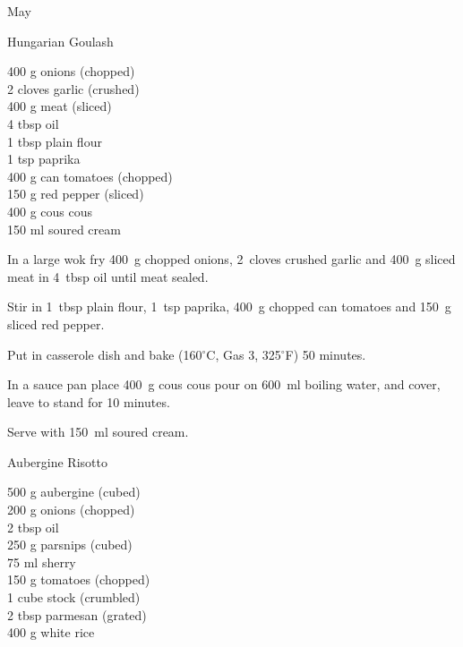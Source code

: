 \begin{menu}{May}
    \begin{recipe}{2}{Hungarian Goulash}%
		\begin{ingredients}
		400 g onions (chopped) \\
	2 cloves garlic (crushed) \\
	400 g meat (sliced) \\
	4 tbsp oil  \\
	1 tbsp plain flour  \\
	1 tsp paprika  \\
	400 g can tomatoes (chopped) \\
	150 g red pepper (sliced) \\
	400 g cous cous  \\
	150 ml soured cream  \\
	
		\end{ingredients}
	
	
    \begin{instructions}
    \item 
        In a large wok fry
        400~g chopped onions,
        2~cloves crushed garlic
        and
        400~g sliced meat
        in
        4~tbsp  oil
        until meat sealed.
      \item 
        Stir in
        1~tbsp  plain flour,
        1~tsp  paprika,
        400~g chopped can tomatoes
        and
        150~g sliced red pepper.
      \item 
        Put in casserole dish and bake (160$^{\circ}$C, Gas 3, 325$^{\circ}$F) 50 minutes.
      \item 
    In a
    sauce pan 
    place
    400~g  cous cous
    pour on
    600~ml  boiling water,
    and cover, leave to stand for 10 minutes.
  \item 
        Serve with
        150~ml  soured cream.
      
    \end{instructions}
    \end{recipe}%
  
    \begin{recipe}{2}{Aubergine Risotto}%
		\begin{ingredients}
		500 g aubergine (cubed) \\
	200 g onions (chopped) \\
	2 tbsp oil  \\
	250 g parsnips (cubed) \\
	75 ml sherry  \\
	150 g tomatoes (chopped) \\
	1 cube stock (crumbled) \\
	2 tbsp parmesan (grated) \\
	400 g white rice  \\
	

\end{ingredients}
\end{recipe}
\end{menu}
